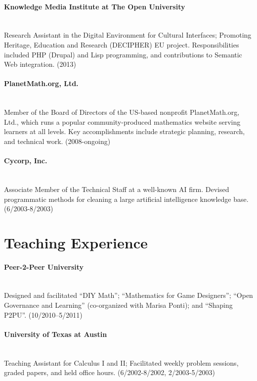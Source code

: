 \documentclass[12pt,article]{memoir}
\begin{document}
\paragraph{Knowledge Media Institute at The Open University} \hspace{.1in} \\
Research Assistant in the Digital Environment for Cultural
Interfaces; Promoting Heritage, Education and Research (DECIPHER) EU
project.  Responsibilities included PHP (Drupal) and Lisp programming,
and contributions to Semantic Web integration. (2013)

\paragraph{PlanetMath.org, Ltd.} \hspace{.1in} \\
Member of the Board of Directors of the US-based nonprofit
PlanetMath.org, Ltd., which runs a popular community-produced
mathematics website serving learners at all levels.  Key
accomplishments include strategic planning, research, and technical
work.  (2008-ongoing)

\paragraph{Cycorp, Inc.}  \hspace{.1in} \\
Associate Member of the Technical Staff at a well-known AI firm.
Devised programmatic methods for cleaning a large artificial
intelligence knowledge base. (6/2003-8/2003)

\section*{Teaching Experience}

\paragraph{Peer-2-Peer University} \hspace{.1in} \\
Designed and facilitated ``DIY Math''; ``Mathematics for
Game Designers''; ``Open Governance and Learning'' (co-organized with
Marisa Ponti); and ``Shaping P2PU''.  (10/2010--5/2011)

\paragraph{University of Texas at Austin} \hspace{.1in} \\
Teaching Assistant for Calculus I and II; Facilitated
weekly problem sessions, graded papers, and held office
hours. (6/2002-8/2002, 2/2003-5/2003)
\end{document}
